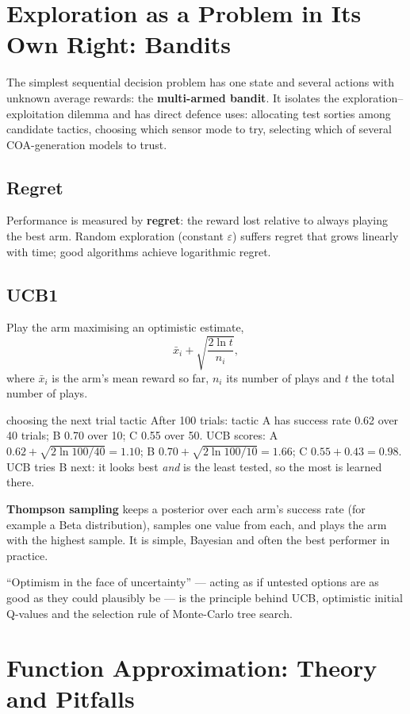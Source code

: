 \documentclass[11pt]{article}
\begin{document}
\section{Exploration as a Problem in Its Own Right: Bandits}
The simplest sequential decision problem has one state and several actions with unknown average rewards: the \textbf{multi-armed bandit}. It isolates the exploration--exploitation dilemma and has direct defence uses: allocating test sorties among candidate tactics, choosing which sensor mode to try, selecting which of several COA-generation models to trust.
\subsection{Regret}
Performance is measured by \textbf{regret}: the reward lost relative to always playing the best arm. Random exploration (constant $\varepsilon$) suffers regret that grows linearly with time; good algorithms achieve logarithmic regret.
\subsection{UCB1}
Play the arm maximising an optimistic estimate,
\[\bar x_i+\sqrt{\frac{2\ln t}{n_i}},\]
where $\bar x_i$ is the arm's mean reward so far, $n_i$ its number of plays and $t$ the total number of plays.
\begin{example}{choosing the next trial tactic}
After 100 trials: tactic A has success rate 0.62 over 40 trials; B 0.70 over 10; C 0.55 over 50. UCB scores: A $0.62+\sqrt{2\ln100/40}=1.10$; B $0.70+\sqrt{2\ln100/10}=1.66$; C $0.55+0.43=0.98$. UCB tries B next: it looks best \emph{and} is the least tested, so the most is learned there.
\end{example}
\textbf{Thompson sampling} keeps a posterior over each arm's success rate (for example a Beta distribution), samples one value from each, and plays the arm with the highest sample. It is simple, Bayesian and often the best performer in practice.
\begin{keypoint}``Optimism in the face of uncertainty'' --- acting as if untested options are as good as they could plausibly be --- is the principle behind UCB, optimistic initial Q-values and the selection rule of Monte-Carlo tree search.\end{keypoint}

\section{Function Approximation: Theory and Pitfalls}
\end{document}
